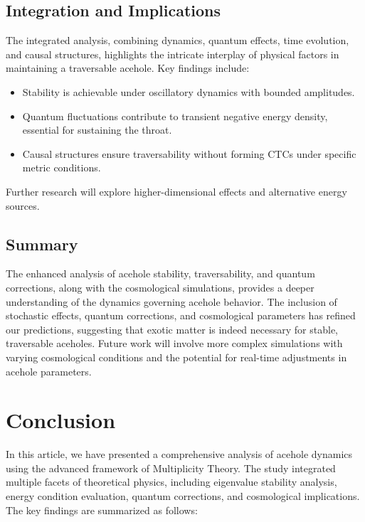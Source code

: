 \documentclass{article}
\theoremstyle{plain}
\begin{document}
\subsection{Integration and Implications}
The integrated analysis, combining dynamics, quantum effects, time evolution, and causal structures, highlights the intricate interplay of physical factors in maintaining a traversable acehole. Key findings include:
\begin{itemize}
    \item Stability is achievable under oscillatory dynamics with bounded amplitudes.
    \item Quantum fluctuations contribute to transient negative energy density, essential for sustaining the throat.
    \item Causal structures ensure traversability without forming CTCs under specific metric conditions.
\end{itemize}
Further research will explore higher-dimensional effects and alternative energy sources.
\subsection{Summary}

The enhanced analysis of acehole stability, traversability, and quantum corrections, along with the cosmological simulations, provides a deeper understanding of the dynamics governing acehole behavior. The inclusion of stochastic effects, quantum corrections, and cosmological parameters has refined our predictions, suggesting that exotic matter is indeed necessary for stable, traversable aceholes. Future work will involve more complex simulations with varying cosmological conditions and the potential for real-time adjustments in acehole parameters.

\section{Conclusion}

In this article, we have presented a comprehensive analysis of acehole dynamics using the advanced framework of Multiplicity Theory. The study integrated multiple facets of theoretical physics, including eigenvalue stability analysis, energy condition evaluation, quantum corrections, and cosmological implications. The key findings are summarized as follows:
\end{document}
